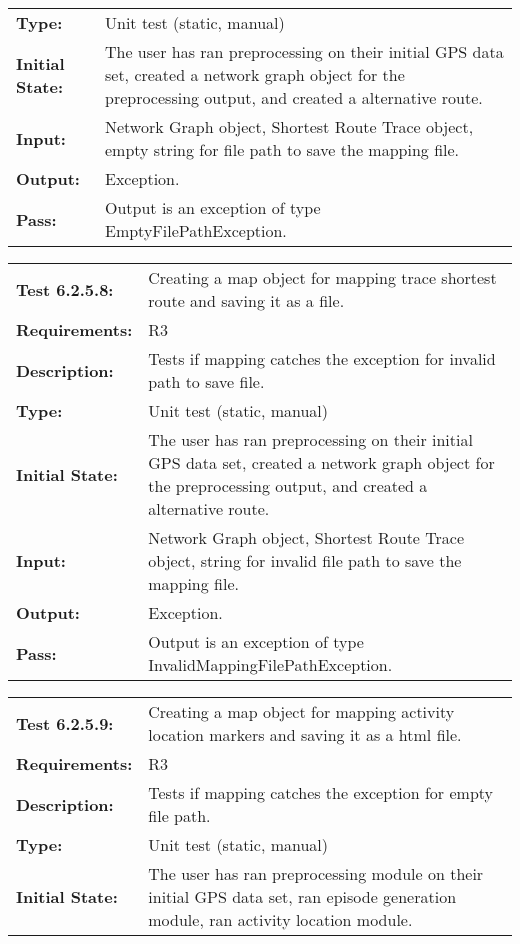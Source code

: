 \documentclass[12pt, titlepage]{article}
\begin{document}
{\begin{tabular}{|l|p{10cm}|}
    \bf{Type}: & Unit test (static, manual) \\
    \bf{Initial State}: & The user has ran preprocessing on their initial GPS data set, created a network graph object for the preprocessing output, and created a alternative route. \\
    \bf{Input}: & Network Graph object, Shortest Route Trace object, empty string for file path to save the mapping file. \\
    \bf{Output}: & Exception. \\
    \bf{Pass}: & Output is an exception of type EmptyFilePathException. \\
    \hline
\end{tabular}
\begin{tabular}{|l|p{10cm}|}
    \hline
    \bf{Test} 6.2.5.8: & Creating a map object for mapping trace shortest route and saving it as a file.\\
    \bf{Requirements}: &  R3\\
    \bf{Description}: & Tests if mapping catches the exception for invalid path to save file. \\
    \bf{Type}: & Unit test (static, manual) \\
    \bf{Initial State}: & The user has ran preprocessing on their initial GPS data set, created a network graph object for the preprocessing output, and created a alternative route. \\
    \bf{Input}: & Network Graph object, Shortest Route Trace object, string for invalid file path to save the mapping file. \\
    \bf{Output}: & Exception. \\
    \bf{Pass}: & Output is an exception of type InvalidMappingFilePathException. \\
    \hline
\end{tabular}
\begin{tabular}{|l|p{10cm}|}
    \hline
    \bf{Test} 6.2.5.9: & Creating a map object for mapping activity location markers and saving it as a html file.\\
    \bf{Requirements}: &  R3\\
    \bf{Description}: & Tests if mapping catches the exception for empty file path. \\
    \bf{Type}: & Unit test (static, manual) \\
    \bf{Initial State}: & The user has ran preprocessing module on their initial GPS data set, ran episode generation module, ran activity location module. \\

\end{tabular}}
\end{document}
